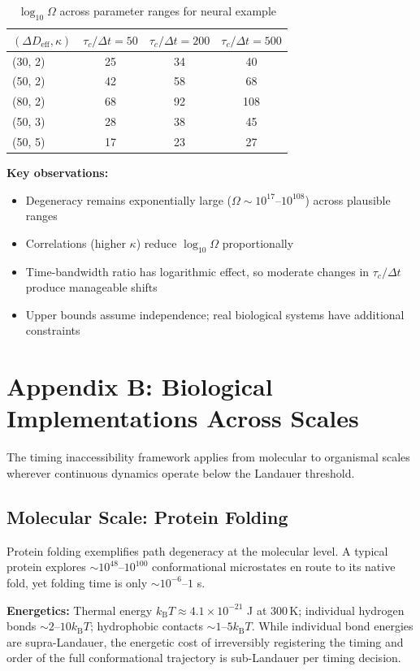 \documentclass[12pt]{article}
\numberwithin{equation}{section}
\newcommand{\kB}{k_{\mathrm{B}}}
\begin{document}
\begin{table}[h]
\centering
\caption{$\log_{10}\Omega$ across parameter ranges for neural example}
\label{tab:omega-sensitivity}
\begin{tabular}{@{}lccc@{}}
\toprule
$(\Delta D_{\text{eff}},\kappa)$ & $\tau_c/\Delta t=50$ & $\tau_c/\Delta t=200$ & $\tau_c/\Delta t=500$ \\
\midrule
(30, 2) & 25 & 34 & 40 \\
(50, 2) & 42 & 58 & 68 \\
(80, 2) & 68 & 92 & 108 \\
(50, 3) & 28 & 38 & 45 \\
(50, 5) & 17 & 23 & 27 \\
\bottomrule
\end{tabular}
\end{table}

\textbf{Key observations:}
\begin{itemize}
\item Degeneracy remains exponentially large ($\Omega \sim 10^{17}$--$10^{108}$) across plausible ranges
\item Correlations (higher $\kappa$) reduce $\log_{10}\Omega$ proportionally
\item Time-bandwidth ratio has logarithmic effect, so moderate changes in $\tau_c/\Delta t$ produce manageable shifts
\item Upper bounds assume independence; real biological systems have additional constraints
\end{itemize}

\section{Appendix B: Biological Implementations Across Scales}

The timing inaccessibility framework applies from molecular to organismal scales wherever continuous dynamics operate below the Landauer threshold.

\subsection{Molecular Scale: Protein Folding}

Protein folding exemplifies path degeneracy at the molecular level. A typical protein explores $\sim 10^{48}$--$10^{100}$ conformational microstates en route to its native fold, yet folding time is only $\sim 10^{-6}$--$1$ s.

\textbf{Energetics:} Thermal energy $\kB T \approx 4.1 \times 10^{-21}$ J at 300\,K; individual hydrogen bonds $\sim 2$--$10 \kB T$; hydrophobic contacts $\sim 1$--$5 \kB T$. While individual bond energies are supra-Landauer, the energetic cost of irreversibly registering the timing and order of the full conformational trajectory is sub-Landauer per timing decision.
\end{document}
